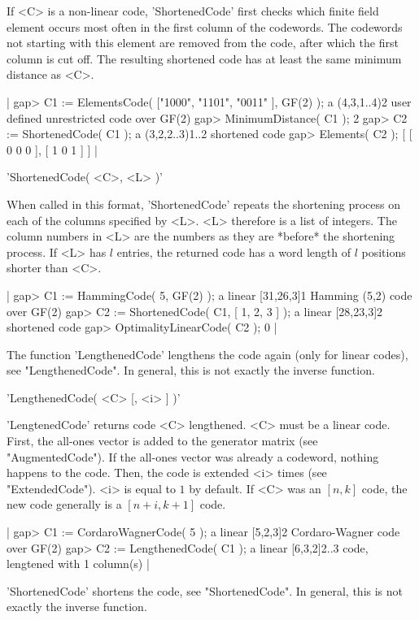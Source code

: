 If  <C> is a non-linear  code,  'ShortenedCode' first checks which finite
field element occurs most often in the first column of the codewords. The
codewords not starting with this element are removed from the code, after
which the first  column is cut off. The  resulting shortened code  has at
least the same minimum distance as <C>.

|    gap> C1 := ElementsCode( ["1000", "1101", "0011" ], GF(2) );
    a (4,3,1..4)2 user defined unrestricted code over GF(2)
    gap> MinimumDistance( C1 );
    2
    gap> C2 := ShortenedCode( C1 );
    a (3,2,2..3)1..2 shortened code
    gap> Elements( C2 );
    [ [ 0 0 0 ], [ 1 0 1 ] ] |

'ShortenedCode( <C>, <L> )'

When called  in    this format, 'ShortenedCode'  repeats  the  shortening
process on each of the columns specified by  <L>. <L> therefore is a list
of integers. The   column numbers in  <L>  are  the numbers as   they are
*before* the shortening  process. If  <L> has  $l$ entries, the  returned
code has a word length of $l$ positions shorter than <C>.

|    gap> C1 := HammingCode( 5, GF(2) );
    a linear [31,26,3]1 Hamming (5,2) code over GF(2)
    gap> C2 := ShortenedCode( C1, [ 1, 2, 3 ] );
    a linear [28,23,3]2 shortened code
    gap> OptimalityLinearCode( C2 );
    0 |

The function 'LengthenedCode'  lengthens the code  again (only for linear
codes), see "LengthenedCode". In general, this is not exactly the inverse
function.


'LengthenedCode( <C> [, <i> ] )'

'LengtenedCode' returns  code  <C>  lengthened.  <C>  must  be a   linear
code. First,  the all-ones vector is added  to the  generator matrix (see
"AugmentedCode"). If the all-ones vector  was already a codeword, nothing
happens   to the  code.  Then,   the code is     extended <i> times  (see
"ExtendedCode"). <i> is  equal to $1$ by  default. If <C> was  an $[n,k]$
code, the new code generally is a $[n+i,k+1]$ code.

|    gap> C1 := CordaroWagnerCode( 5 );
    a linear [5,2,3]2 Cordaro-Wagner code over GF(2)
    gap> C2 := LengthenedCode( C1 );
    a linear [6,3,2]2..3 code, lengtened with 1 column(s) |

'ShortenedCode' shortens the code,  see "ShortenedCode". In general, this
is not exactly the inverse function.

